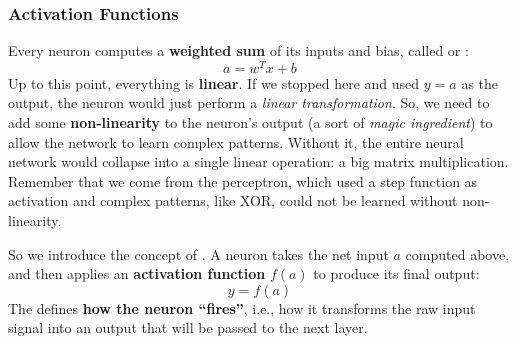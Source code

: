 \subsubsection{Activation Functions}\label{sec:activation-functions}

Every neuron computes a \textbf{weighted sum} of its inputs and bias, called  or :
\begin{equation*}
    a = w^{T} x + b
\end{equation*}
Up to this point, everything is \textbf{linear}. If we stopped here and used $y = a$ as the output, the neuron would just perform a \emph{linear transformation}. So, we need to add some \textbf{non-linearity} to the neuron's output (a sort of \emph{magic ingredient}) to allow the network to learn complex patterns. Without it, the entire neural network would collapse into a single linear operation: a big matrix multiplication. Remember that we come from the perceptron, which used a step function as activation and complex patterns, like XOR, could not be learned without non-linearity.

\highspace
So we introduce the concept of . A neuron takes the net input $a$ computed above, and then applies an \textbf{activation function} $f(a)$ to produce its final output:
\begin{equation*}
    y = f(a)
\end{equation*}
The  defines \textbf{how the neuron ``fires''}, i.e., how it transforms the raw input signal into an output that will be passed to the next layer.


